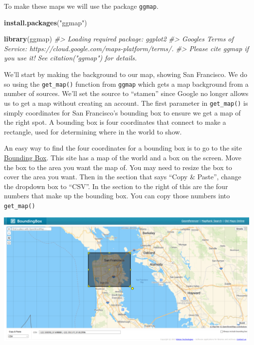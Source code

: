 \documentclass[
  12pt,
]{book}
\newenvironment{Shaded}{\begin{snugshade}}{\end{snugshade}}
\newcommand{\CommentTok}[1]{\textcolor[rgb]{0.56,0.35,0.01}{\textit{#1}}}
\newcommand{\KeywordTok}[1]{\textcolor[rgb]{0.13,0.29,0.53}{\textbf{#1}}}
\newcommand{\NormalTok}[1]{#1}
\newcommand{\StringTok}[1]{\textcolor[rgb]{0.31,0.60,0.02}{#1}}
\begin{document}
To make these maps we will use the package \texttt{ggmap}.

\begin{Shaded}
\begin{Highlighting}[]
\KeywordTok{install.packages}\NormalTok{(}\StringTok{"ggmap"}\NormalTok{)}
\end{Highlighting}
\end{Shaded}

\begin{Shaded}
\begin{Highlighting}[]
\KeywordTok{library}\NormalTok{(ggmap)}
\CommentTok{\#> Loading required package: ggplot2}
\CommentTok{\#> Google\textquotesingle{}s Terms of Service: https://cloud.google.com/maps{-}platform/terms/.}
\CommentTok{\#> Please cite ggmap if you use it! See citation("ggmap") for details.}
\end{Highlighting}
\end{Shaded}

We'll start by making the background to our map, showing San Francisco. We do so using the \texttt{get\_map()} function from \texttt{ggmap} which gets a map background from a number of sources. We'll set the source to ``stamen'' since Google no longer allows us to get a map without creating an account. The first parameter in \texttt{get\_map()} is simply coordinates for San Francisco's bounding box to ensure we get a map of the right spot. A bounding box is four coordinates that connect to make a rectangle, used for determining where in the world to show.

An easy way to find the four coordinates for a bounding box is to go to the site \href{https://boundingbox.klokantech.com/}{Bounding Box}. This site has a map of the world and a box on the screen. Move the box to the area you want the map of. You may need to resize the box to cover the area you want. Then in the section that says ``Copy \& Paste'', change the dropdown box to ``CSV''. In the section to the right of this are the four numbers that make up the bounding box. You can copy those numbers into \texttt{get\_map()}

\includegraphics{images/bounding_box.PNG}
\end{document}
